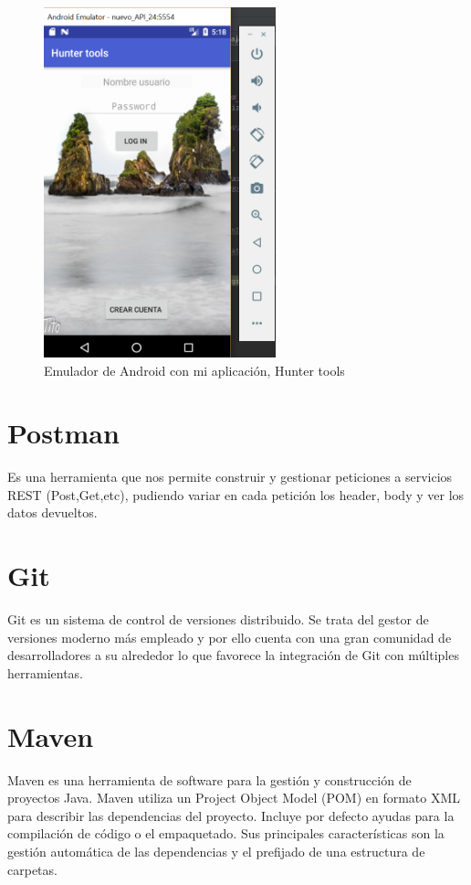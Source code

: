 \begin{figure}
		\centering
		\includegraphics[width=0.6\textwidth] {emulador.png}
		\caption{Emulador de Android con mi aplicación, Hunter tools}
		\label{fig:emulador}
	\end{figure}
 




\section{Postman}

Es una herramienta que nos permite construir y gestionar peticiones a servicios REST (Post,Get,etc), pudiendo variar en cada petición los header, body y ver los datos devueltos.


\section{Git}
Git es un sistema de control de versiones distribuido. Se trata del gestor de versiones moderno
más empleado y por ello cuenta con una gran comunidad de desarrolladores a su alrededor lo
que favorece la integración de Git con múltiples herramientas.
\section{Maven}
Maven es una herramienta de software para la gestión y construcción de proyectos Java.
 Maven utiliza un Project Object Model (POM) en formato
XML para describir las dependencias del proyecto. Incluye por defecto ayudas para la compilación de código o el empaquetado. Sus principales características son la gestión automática de las dependencias y el prefijado de una estructura de carpetas. 







